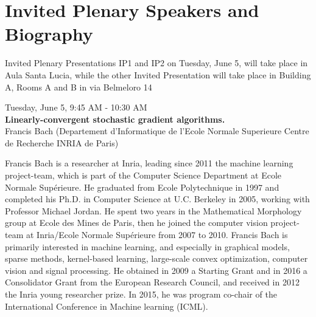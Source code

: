 
\chapter*{Invited Plenary Speakers and Biography}
{\small{Invited Plenary Presentations  IP1 and IP2 on Tuesday, June 5, will take place in Aula Santa Lucia, while the other Invited Presentation will take place in Building A, Rooms A and B in via Belmeloro 14}}


\newpage\vspace{2cm}
\begin{center}{\Large{
      Tuesday, June 5, 9:45 AM - 10:30 AM \\
      \textbf{Linearly-convergent stochastic gradient algorithms.}\\
      Francis Bach (Departement d'Informatique de l'Ecole Normale Superieure Centre de Recherche INRIA de Paris)  
}}
\end{center}
\vspace{1cm}

\begin{wrapfloat}{figure}{o}{0pt}
  \texttt{[image: \{images/speakers/francis.bach@ens.fr]}.jpg}
\end{wrapfloat}

Francis Bach is a researcher at Inria, leading since 2011 the machine learning project-team, which is part of the Computer Science Department at Ecole Normale Supérieure. He graduated from Ecole Polytechnique in 1997 and completed his Ph.D. in Computer Science at U.C. Berkeley in 2005, working with Professor Michael Jordan. He spent two years in the Mathematical Morphology group at Ecole des Mines de Paris, then he joined the computer vision project-team at Inria/Ecole Normale Supérieure from 2007 to 2010. Francis Bach is primarily interested in machine learning, and especially in graphical models, sparse methods, kernel-based learning, large-scale convex optimization, computer vision and signal processing. He obtained in 2009 a Starting Grant and in 2016 a Consolidator Grant from the European Research Council, and received in 2012 the Inria young researcher prize. In 2015, he was program co-chair of the International Conference in Machine learning (ICML).  
\\\\

